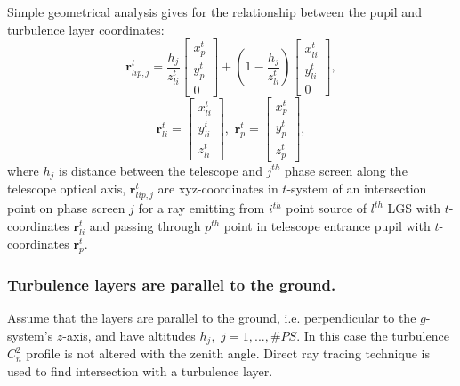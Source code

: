 Simple geometrical analysis gives for the
relationship between the pupil and turbulence layer coordinates:
\begin{equation} \label{eq:pupil-to-layer}
  \bm{r}^{t}_{lip,j} =
  \frac{h_{j}}{z^{t}_{li}}
  \left[
  \begin{array}{c}
	  x^{t}_{p} \\
	  y^{t}_{p} \\
	  0
	\end{array}
  \right] +
  (1-\frac{h_{j}}{z^{t}_{li}})
  \left[
  \begin{array}{c}
	  x^{t}_{li} \\
	  y^{t}_{li} \\
	  0
	\end{array}
  \right],
\end{equation}
$$
  \bm{r}^{t}_{li} =
  \left[
  \begin{array}{c}
	  x^{t}_{li} \\
	  y^{t}_{li} \\
	  z^{t}_{li}
	\end{array}
  \right], \,\,
  \bm{r}^{t}_{p} =
  \left[
  \begin{array}{c}
	  x^{t}_{p} \\
	  y^{t}_{p} \\
	  z^{t}_{p}
	\end{array}
  \right],
$$
where $h_{j}$ is distance between the telescope and $j^{th}$ phase screen
along the telescope optical axis,
$\bm{r}^{t}_{lip,j}$ are xyz-coordinates in $t$-system of an
intersection point on phase screen $j$ for a ray emitting from $i^{th}$ point
source of $l^{th}$ LGS with $t$-coordinates $\bm{r}^{t}_{li}$ and
passing through $p^{th}$ point in telescope entrance pupil with $t$-coordinates
$\bm{r}^{t}_{p}$.

\subsubsection{Turbulence layers are parallel to the ground.}

Assume that the layers are parallel to the ground, i.e. perpendicular to the
$g$-system's $z$-axis, and have altitudes $h_{j}, \,\, j = 1,...,\#PS$. In
this case the turbulence $C_{n}^{2}$ profile is not altered with the zenith
angle. Direct ray tracing technique is used to find intersection with a
turbulence layer.

